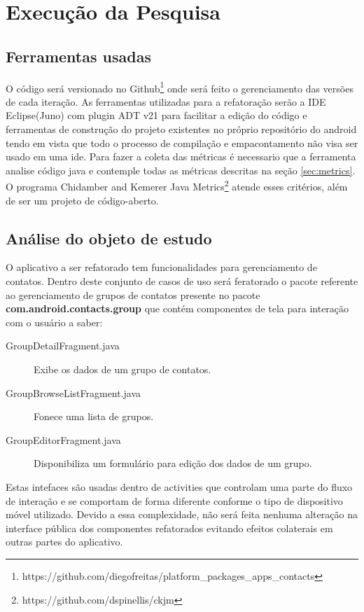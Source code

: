 \chapter{Execução da Pesquisa}


\section{Ferramentas usadas}

O código será versionado no
Github\footnote{https://github.com/diegofreitas/platform_packages_apps_contacts}
onde será feito o gerenciamento das versões de cada iteração.
As ferramentas utilizadas para a refatoração serão a IDE Eclipse(Juno) com
plugin ADT v21 para facilitar a edição do código e ferramentas de construção
do projeto existentes no próprio repositório do android tendo em vista que todo
o processo de compilação e empacontamento não visa ser usado em uma ide.
Para fazer a coleta das métricas é necessario que a ferramenta analise código
java e contemple todas as métricas descritas na seção \ref{sec:metrics}. O
programa Chidamber and Kemerer Java Metrics\footnote{https://github.com/dspinellis/ckjm} atende esses
critérios, além de ser um projeto de código-aberto.

\section{Análise do objeto de estudo}

O aplicativo a ser refatorado tem funcionalidades para gerenciamento de
contatos. Dentro deste conjunto de casos de uso será feratorado o pacote
referente ao gerenciamento de grupos de contatos presente no pacote
\textbf{com.android.contacts.group} que contém componentes de tela para
interação com o usuário a saber:
\begin{description}
\item[GroupDetailFragment.java] Exibe os dados de um grupo de contatos.
\item[GroupBrowseListFragment.java] Fonece uma lista de grupos.
\item[GroupEditorFragment.java] Disponibiliza um formulário para edição dos
dados de um grupo.
\end{description}

Estas intefaces são usadas dentro de activities que controlam uma parte do fluxo
de interação e se comportam de forma diferente conforme o tipo de dispositivo
móvel utilizado. Devido a essa complexidade, não será feita nenhuma alteração na
interface pública dos componentes refatorados evitando efeitos colaterais em
outras partes do aplicativo.

